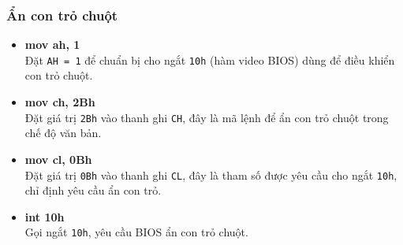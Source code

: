 \documentclass[12pt]{article}
\begin{document}
\subsubsection*{Ẩn con trỏ chuột}
\begin{itemize}
    \item \textbf{mov ah, 1} \\
    Đặt \texttt{AH = 1} để chuẩn bị cho ngắt \texttt{10h} (hàm video BIOS) dùng để điều khiển con trỏ chuột.

    \item \textbf{mov ch, 2Bh} \\
    Đặt giá trị \texttt{2Bh} vào thanh ghi \texttt{CH}, đây là mã lệnh để ẩn con trỏ chuột trong chế độ văn bản.

    \item \textbf{mov cl, 0Bh} \\
    Đặt giá trị \texttt{0Bh} vào thanh ghi \texttt{CL}, đây là tham số được yêu cầu cho ngắt \texttt{10h}, chỉ định yêu cầu ẩn con trỏ.

    \item \textbf{int 10h} \\
    Gọi ngắt \texttt{10h}, yêu cầu BIOS ẩn con trỏ chuột.
\end{itemize}
\end{document}
